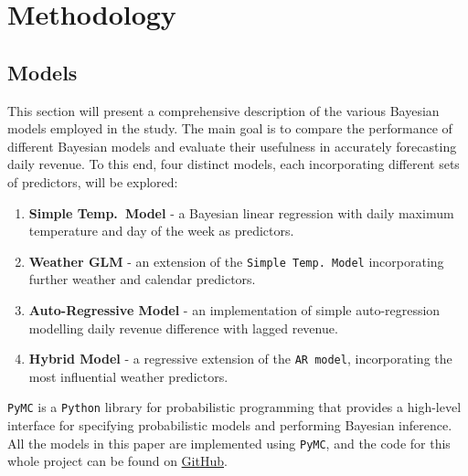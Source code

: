 \section{Methodology}

\subsection{Models}
This section will present a comprehensive description of the various Bayesian models
employed in the study. The main goal is to compare the
performance of different Bayesian models and evaluate their usefulness in
accurately forecasting daily revenue. To this end, four distinct models, each
incorporating different sets of predictors, will be explored: 
\begin{enumerate}
  \item \textbf{Simple Temp.\ Model} - a Bayesian linear regression
    with daily maximum temperature and day of the week as predictors.
  \item \textbf{Weather GLM} - an extension of the \texttt{Simple Temp.\ Model}
    incorporating further weather and calendar predictors.
  \item \textbf{Auto-Regressive Model} - an implementation of simple
    auto-regression modelling daily revenue difference with lagged revenue.
  \item \textbf{Hybrid Model} - a regressive extension of the \texttt{AR
    model}, incorporating the most influential weather predictors.
\end{enumerate}

\texttt{PyMC} is a \texttt{Python} library for probabilistic programming that
provides a high-level interface for specifying probabilistic models and
performing Bayesian inference. All the models in this paper are implemented
using \texttt{PyMC}, and the code for this whole project can be found on
\href{https://github.com/louisbrandt/bayesian-data-analysis}{GitHub}.

